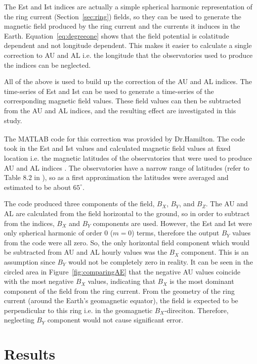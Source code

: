 \documentclass[12pt]{report} %
\begin{document}
The Est and Ist indices are actually a simple spherical harmonic representation of the ring current (Section~\ref{sec:ring}) fields, so they can be used to generate the magnetic field produced by the ring current and the currents it induces in the Earth. Equation~\ref{eq:degreeone} shows that the field potential is colatitude dependent and not longitude dependent. This makes it easier to calculate a single correction to AU and AL i.e. the longitude that the observatories used to produce the indices can be neglected. 

All of the above is used to build up the correction of the AU and AL indices. The time-series of Est and Ist  can be used to generate a time-series of the corresponding magnetic field values. These field values can then be subtracted from the AU and AL indices, and the resulting effect are investigated in this study. 

The MATLAB\textsuperscript{\textregistered} code for this correction was provided by Dr.Hamilton. The code took in the Est and Ist values and calculated magnetic field values at fixed location i.e. the magnetic latitudes of the observatories that were used to produce AU and AL indices \citep{men11}. The observatories have a narrow range of latitudes (refer to Table 8.2 in \citep{men11}), so as a first approximation the latitudes were averaged and estimated to be about $65^\circ$. 

The code produced three components of the field, $B_X$, $B_Y$, and $B_Z$. The AU and AL are calculated from the field horizontal to the ground, so in order to subtract from the indices, $B_X$ and $B_Y$ components are used. However, the Est and Ist were only spherical harmonic of order 0 ($m=0$) terms, therefore the output $B_Y$ values from the code were all zero. So, the only horizontal field component which would be subtracted from AU and AL hourly values was the $B_X$ component. This is an assumption since $B_Y$ would not be completely zero in reality.  It can be seen in the circled area in Figure~\ref{fig:comparingAE} that the negative AU values coincide with the most negative $B_X$ values, indicating that $B_X$ is the most dominant component of the field from the ring current. From the geometry of the ring current (around the Earth's geomagnetic equator), the field is expected to be perpendicular to this ring i.e. in the geomagnetic $B_X$-direciton. Therefore, neglecting $B_Y$ component would not cause significant error.

\chapter{Results}\label{chap:results}
\vspace{0pt}
\end{document}
